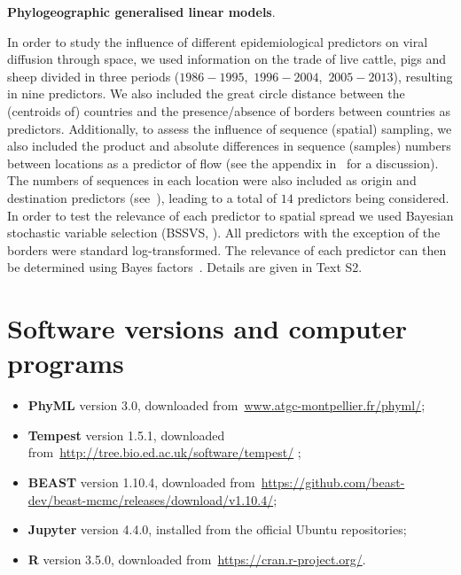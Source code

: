 \documentclass[10pt]{article}
\begin{document}
\textbf{Phylogeographic generalised linear models}.

In order to study the influence of different epidemiological predictors on viral diffusion through space, we used information on the trade of live cattle, pigs and sheep divided in three periods ($1986-1995$,~$1996-2004$,~$2005-2013$), resulting in nine predictors. %
We also included the great circle distance between the (centroids of) countries and the presence/absence of borders between countries as predictors.
Additionally, to assess the influence of sequence (spatial) sampling, we also included the product and absolute differences in sequence (samples) numbers between locations as a predictor of flow (see the appendix in~\cite{Lemey2014} for a discussion).
The numbers of sequences in each location were also included as origin and destination predictors (see~\cite{Dudas2017}), leading to a total of $14$ predictors being considered.
In order to test the relevance of each predictor to spatial spread we used Bayesian stochastic variable selection (BSSVS, \cite{Lemey2009}).
All predictors with the exception of the borders were standard log-transformed. %
The relevance of each predictor can then be determined using Bayes factors~\citep{KassRaftery1995,Lemey2009,Lemey2014}.
Details are given in Text S2.

\section*{Software versions and computer programs}

\begin{itemize}
 \item \textbf{PhyML} version 3.0, downloaded from~\url{www.atgc-montpellier.fr/phyml/};
 \item \textbf{Tempest} version 1.5.1, downloaded from~\url{http://tree.bio.ed.ac.uk/software/tempest/}  ;
 \item \textbf{BEAST} version 1.10.4, downloaded from~\url{https://github.com/beast-dev/beast-mcmc/releases/download/v1.10.4/};
 \item  \textbf{Jupyter} version 4.4.0, installed from the official Ubuntu repositories;
 \item \textbf{R} version 3.5.0, downloaded from~\url{https://cran.r-project.org/}.
\end{itemize}
\end{document}
